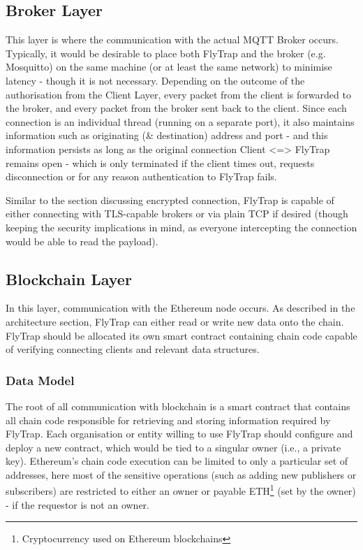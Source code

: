 \subsection{Broker Layer}

This layer is where the communication with the actual MQTT Broker occurs. Typically, it would be desirable to place both FlyTrap and the broker (e.g. Mosquitto) on the same machine (or at least the same network) to minimise latency - though it is not necessary. Depending on the outcome of the authorisation from the Client Layer, every packet from the client is forwarded to the broker, and every packet from the broker sent back to the client. Since each connection is an individual thread (running on a separate port), it also maintains information such as originating (\& destination) address and port - and this information persists as long as the original connection Client <=> FlyTrap remains open - which is only terminated if the client times out, requests disconnection or for any reason authentication to FlyTrap fails.

Similar to the section discussing encrypted connection, FlyTrap is capable of either connecting with TLS-capable brokers or via plain TCP if desired (though keeping the security implications in mind, as everyone intercepting the connection would be able to read the payload).

\subsection{Blockchain Layer}
In this layer, communication with the Ethereum node occurs. As described in the architecture section, FlyTrap can either read or write new data onto the chain. FlyTrap should be allocated its own smart contract containing chain code capable of verifying connecting clients and relevant data structures. 
\subsubsection{Data Model}
The root of all communication with blockchain is a smart contract that contains all chain code responsible for retrieving and storing information required by FlyTrap. Each organisation or entity willing to use FlyTrap should configure and deploy a new contract, which would be tied to a singular owner (i.e., a private key). Ethereum's chain code execution can be limited to only a particular set of addresses, here most of the sensitive operations (such as adding new publishers or subscribers) are restricted to either an owner or payable ETH\footnote{Cryptocurrency used on Ethereum blockchains} (set by the owner) - if the requestor is not an owner.

